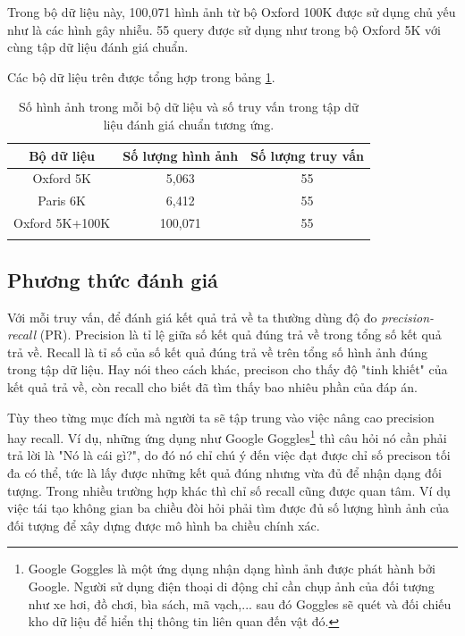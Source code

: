 Trong bộ dữ liệu này, 100,071 hình ảnh từ bộ Oxford 100K được sử dụng chủ yếu như là các hình gây nhiễu. 55 query được sử dụng như trong bộ Oxford 5K với cùng tập dữ liệu đánh giá chuẩn.

Các bộ dữ liệu trên được tổng hợp trong bảng \ref{table:dataset}.
\begin{table}
\begin{center}
	\begin{tabular}{c c c}
	\hline
	Bộ dữ liệu & Số lượng hình ảnh & Số lượng truy vấn \\ \hline
    Oxford 5K & 5,063 & 55 \\ 
    Paris 6K & 6,412 & 55 \\
    Oxford 5K+100K & 100,071 & 55 \\
	\hline
	\label{table:datasets}
	\end{tabular}
\end{center}
\caption[Số hình ảnh trong mỗi bộ dữ liệu và số truy vấn trong tập dữ liệu đánh giá chuẩn tương ứng]{Số hình ảnh trong mỗi bộ dữ liệu và số truy vấn trong tập dữ liệu đánh giá chuẩn tương ứng.}
\label{table:dataset}
\end{table}

\subsection{Phương thức đánh giá}
\label{evaluation}
Với mỗi truy vấn, để đánh giá kết quả trả về ta thường dùng độ đo \textit{precision-recall} (PR). Precision là tỉ lệ giữa số kết quả đúng trả về trong tổng số kết quả trả về. Recall là tỉ số của số kết quả đúng trả về trên tổng số hình ảnh đúng trong tập dữ liệu. Hay nói theo cách khác, precison cho thấy độ "tinh khiết" của kết quả trả về, còn recall cho biết đã tìm thấy bao nhiêu phần của đáp án.

Tùy theo từng mục đích mà người ta sẽ tập trung vào việc nâng cao precision hay recall. Ví dụ, những ứng dụng như Google Goggles\footnote{Google Goggles là một ứng dụng nhận dạng hình ảnh được phát hành bởi Google. Người sử dụng điện thoại di động chỉ cần chụp ảnh của đối tượng như xe hơi, đồ chơi, bìa sách, mã vạch,... sau đó Goggles sẽ quét và đối chiếu kho dữ liệu để hiển thị thông tin liên quan đến vật đó.} thì câu hỏi nó cần phải trả lời là "Nó là cái gì?", do đó nó chỉ chú ý đến việc đạt được chỉ số precison tối đa có thể, tức là lấy được những kết quả đúng nhưng vừa đủ để nhận dạng đối tượng. Trong nhiều trường hợp khác thì chỉ số recall cũng được quan tâm. Ví dụ việc tái tạo không gian ba chiều đòi hỏi phải tìm được đủ số lượng hình ảnh của đối tượng để xây dựng được mô hình ba chiều chính xác.

